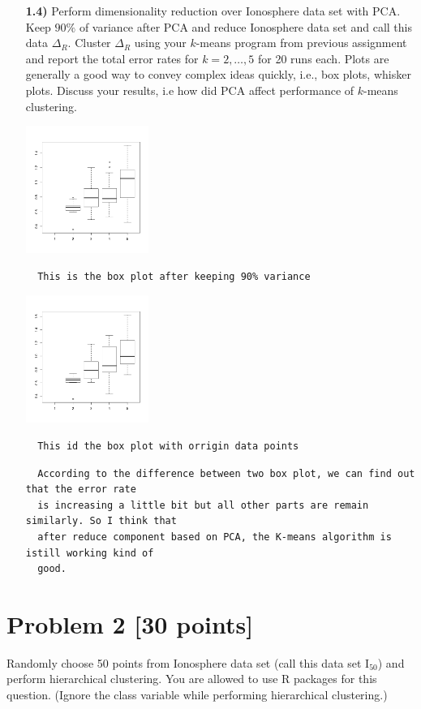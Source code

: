 \documentclass{article}
\begin{document}
\begin{enumerate}
  \item[\textbf{1.4)}] Perform dimensionality reduction over Ionosphere data set with PCA.  Keep $90\%$ of variance  after PCA and reduce Ionosphere data set and call this data $\Delta_R$. Cluster  $\Delta_R$ using your $k$-means program from previous assignment and report the total error rates for $k = 2,\ldots,5$ for 20 runs each. Plots are generally a good way to convey complex ideas quickly, i.e., box plots, whisker plots. Discuss your results, i.e how did PCA affect  performance of $k$-means clustering.
  
  \includegraphics[width=4cm]{1-4.png}
  \begin{verbatim}
  This is the box plot after keeping 90% variance
  \end{verbatim}
  \includegraphics[width=4cm]{1-4-1.png}
  \begin{verbatim}
  This id the box plot with orrigin data points
  \end{verbatim}
  
  \begin{verbatim}
  According to the difference between two box plot, we can find out that the error rate 
  is increasing a little bit but all other parts are remain similarly. So I think that
  after reduce component based on PCA, the K-means algorithm is istill working kind of 
  good. 
  \end{verbatim}
\end{enumerate}  


\pagebreak
 \section*{Problem 2 [30 points]}  Randomly choose 50 points from Ionosphere data set (call this data set $\text{I}_{50}$) and perform hierarchical clustering. You are allowed to use R packages for this question. (Ignore the class variable while performing hierarchical clustering.)
 \\ 
 
\end{document}
